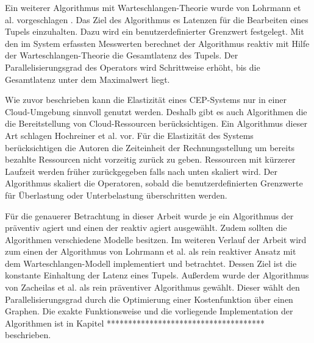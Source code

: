 Ein weiterer Algorithmus mit Warteschlangen-Theorie wurde von Lohrmann et al. vorgeschlagen \cite{lohrmann_elastic_2015}.
Das Ziel des Algorithmus es Latenzen für die Bearbeiten eines Tupels einzuhalten.
Dazu wird ein benutzerdefinierter Grenzwert festgelegt.
Mit den im System erfassten Messwerten berechnet der Algorithmus reaktiv mit Hilfe der Warteschlangen-Theorie die Gesamtlatenz des Tupels.
Der Parallelisierungsgrad des Operators wird Schrittweise erhöht, bis die Gesamtlatenz unter dem Maximalwert liegt.

Wie zuvor beschrieben kann die Elastizität eines CEP-Systems nur in einer Cloud-Umgebung sinnvoll genutzt werden.
Deshalb gibt es auch Algorithmen die die Bereitstellung von Cloud-Ressourcen berücksichtigen.
Ein Algorithmus dieser Art schlagen Hochreiner et al. vor.
Für die Elastizität des Systems berücksichtigen die Autoren die Zeiteinheit der Rechnungsstellung um bereits bezahlte Ressourcen nicht vorzeitig zurück zu geben.
Ressourcen mit kürzerer Laufzeit werden früher zurückgegeben falls nach unten skaliert wird.
Der Algorithmus skaliert die Operatoren, sobald die benutzerdefinierten Grenzwerte für Überlastung oder Unterbelastung überschritten werden.

Für die genauerer Betrachtung in dieser Arbeit wurde je ein Algorithmus der präventiv agiert und einen der reaktiv agiert ausgewählt.
Zudem sollten die Algorithmen verschiedene Modelle besitzen.
Im weiteren Verlauf der Arbeit wird zum einen der Algorithmus von Lohrmann et al. als rein reaktiver Ansatz mit dem Warteschlangen-Modell implementiert und betrachtet.
Dessen Ziel ist die konstante Einhaltung der Latenz eines Tupels.
Außerdem wurde der Algorithmus von Zacheilas et al. als rein präventiver Algorithmus gewählt.
Dieser wählt den Parallelisierungsgrad durch die Optimierung einer Kostenfunktion über einen Graphen.
Die exakte Funktionsweise und die vorliegende Implementation der Algorithmen ist in Kapitel ************************************* beschrieben.




